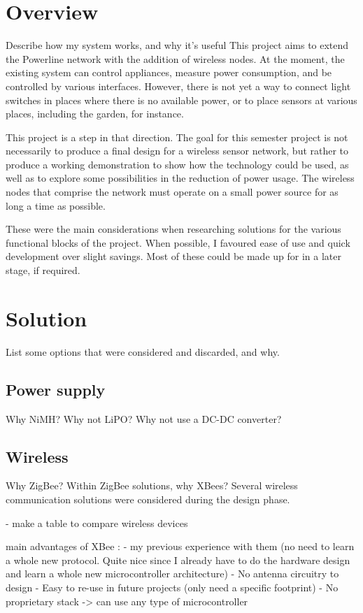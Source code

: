 \section{Overview}
Describe how my system works, and why it's useful
This project aims to extend the Powerline network with the addition of wireless
nodes. At the moment, the existing system can control appliances, measure power
consumption, and be controlled by various interfaces. However, there is not yet
a way to connect light switches in places where there is no available power, or
to place sensors at various places, including the garden, for instance.

This project is a step in that direction. The goal for this semester project is
not necessarily to produce a final design for a wireless sensor network, but
rather to produce a working demonstration to show how the technology could be
used, as well as to explore some possibilities in the reduction of power usage.
The wireless nodes that comprise the network must operate on a small power
source for as long a time as possible.

These were the main considerations when researching solutions for the various
functional blocks of the project. When possible, I favoured ease of use and
quick development over slight savings. Most of these could be made up for in a
later stage, if required.

\section{Solution}
List some options that were considered and discarded, and why.

\subsection{Power supply}
Why NiMH? Why not LiPO? Why not use a DC-DC converter?

\subsection{Wireless}
Why ZigBee? Within ZigBee solutions, why XBees?
Several wireless communication solutions were considered during the design
phase. 

- make a table to compare wireless devices

main advantages of XBee : 
- my previous experience with them (no need to learn a
  whole new protocol. Quite nice since I already have to do the hardware design
  and learn a whole new microcontroller architecture)
- No antenna circuitry to design
- Easy to re-use in future projects (only need a specific footprint)
- No proprietary stack -> can use any type of microcontroller

